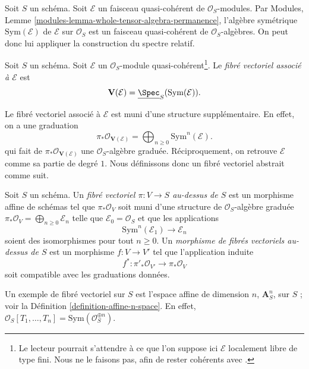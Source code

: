 \noindent
Soit $S$ un schéma.
Soit $\mathcal{E}$ un faisceau quasi-cohérent de $\mathcal{O}_S$-modules.
Par Modules, Lemme \ref{modules-lemma-whole-tensor-algebra-permanence},
l'algèbre symétrique $\text{Sym}(\mathcal{E})$ de
$\mathcal{E}$ sur $\mathcal{O}_S$
est un faisceau quasi-cohérent de $\mathcal{O}_S$-algèbres.
On peut donc lui appliquer la construction du spectre relatif.

\begin{definition}
\label{definition-vector-bundle}
Soit $S$ un schéma. Soit $\mathcal{E}$ un
$\mathcal{O}_S$-module quasi-cohérent\footnote{Le lecteur pourrait s'attendre
à ce que l'on suppose ici $\mathcal{E}$ localement libre de type fini. Nous ne
le faisons pas, afin de rester cohérents avec \cite[II, définition 1.7.8]{EGA}.}.
Le {\it fibré vectoriel associé à $\mathcal{E}$} est
$$
\mathbf{V}(\mathcal{E}) = \underline{\Spec}_S(\text{Sym}(\mathcal{E})).
$$
\end{definition}

\noindent
Le fibré vectoriel associé à $\mathcal{E}$ est muni d'une structure
supplémentaire. En effet, on a une graduation
$$
\pi_*\mathcal{O}_{\mathbf{V}(\mathcal{E})} =
\bigoplus\nolimits_{n \geq 0} \text{Sym}^n(\mathcal{E}).
$$
qui fait de $\pi_*\mathcal{O}_{\mathbf{V}(\mathcal{E})}$
une $\mathcal{O}_S$-algèbre graduée. Réciproquement, on retrouve
$\mathcal{E}$ comme sa partie de degré $1$.
Nous définissons donc un fibré vectoriel abstrait comme suit.

\begin{definition}
\label{definition-abstract-vector-bundle}
Soit $S$ un schéma. Un {\it fibré vectoriel $\pi : V \to S$ au-dessus de $S$}
est un morphisme affine de schémas tel que $\pi_*\mathcal{O}_V$ soit muni
d'une structure de $\mathcal{O}_S$-algèbre graduée
$\pi_*\mathcal{O}_V = \bigoplus\nolimits_{n \geq 0} \mathcal{E}_n$
telle que $\mathcal{E}_0 = \mathcal{O}_S$ et que les applications
$$
\text{Sym}^n(\mathcal{E}_1) \longrightarrow \mathcal{E}_n
$$
soient des isomorphismes pour tout $n \geq 0$. Un {\it morphisme de fibrés
vectoriels au-dessus de $S$} est un morphisme $f : V \to V'$ tel que
l'application induite
$$
f^* : \pi'_*\mathcal{O}_{V'} \longrightarrow \pi_*\mathcal{O}_V
$$ soit compatible avec les graduations données.
\end{definition}

\noindent
Un exemple de fibré vectoriel sur $S$ est l'espace affine de dimension $n$,
$\mathbf{A}^n_S$, sur $S$ ;
voir la Définition \ref{definition-affine-n-space}. En effet,
$\mathcal{O}_S[T_1, \ldots, T_n] = \text{Sym}(\mathcal{O}_S^{\oplus n})$.

